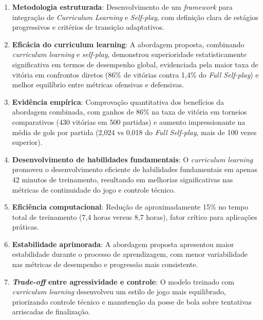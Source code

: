 \begin{enumerate}
    \item \textbf{Metodologia estruturada}: Desenvolvimento de um \textit{framework} para integração de \textit{Curriculum Learning} e \textit{Self-play}, com definição clara de estágios progressivos e critérios de transição adaptativos.
    
    \item \textbf{Eficácia do curriculum learning}: A abordagem proposta, combinando \textit{curriculum learning} e \textit{self-play}, demonstrou superioridade estatisticamente significativa em termos de desempenho global, evidenciada pela maior taxa de vitória em confrontos diretos (86\% de vitórias contra 1,4\% do \textit{Full Self-play}) e melhor equilíbrio entre métricas ofensivas e defensivas.
    
    \item \textbf{Evidência empírica}: Comprovação quantitativa dos benefícios da abordagem combinada, com ganhos de 86\% na taxa de vitória em torneios comparativos (430 vitórias em 500 partidas) e aumento impressionante na média de gols por partida (2,024 vs 0,018 do \textit{Full Self-play}, mais de 100 vezes superior).
    
    \item \textbf{Desenvolvimento de habilidades fundamentais}: O \textit{curriculum learning} promoveu o desenvolvimento eficiente de habilidades fundamentais em apenas 42 minutos de treinamento, resultando em melhorias significativas nas métricas de continuidade do jogo e controle técnico.
    
    \item \textbf{Eficiência computacional}: Redução de aproximadamente 15\% no tempo total de treinamento (7,4 horas versus 8,7 horas), fator crítico para aplicações práticas.
    
    \item \textbf{Estabilidade aprimorada}: A abordagem proposta apresentou maior estabilidade durante o processo de aprendizagem, com menor variabilidade nas métricas de desempenho e progressão mais consistente.
    
    \item \textbf{\textit{Trade-off} entre agressividade e controle}: O modelo treinado com \textit{curriculum learning} desenvolveu um estilo de jogo mais equilibrado, priorizando controle técnico e manutenção da posse de bola sobre tentativas arriscadas de finalização.
\end{enumerate}

